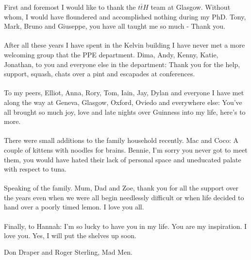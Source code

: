\begin{acknowledgements}
First and foremost I would like to thank the $t\bar{t}H$ team at Glasgow. Without whom, I would have floundered and accomplished nothing during my PhD. Tony, Mark, Bruno and Giuseppe, you have all taught me so much - Thank you.\\
\\
After all these years I have spent in the Kelvin building I have never met a more welcoming group that the PPE department. Dima, Andy, Kenny, Katie, Jonathan, to you and everyone else in the department: Thank you for the help, support, squash, chats over a pint and escapades at conferences.\\
\\
To my peers, Elliot, Anna, Rory, Tom, Iain, Jay, Dylan and everyone I have met along the way at Geneva, Glasgow, Oxford, Oviedo and everywhere else: You've all brought so much joy, love and late nights over Guinness into my life, here’s to more.\\
\\
There were small additions to the family household recently. Mac and Coco: A couple of kittens with noodles for brains. Bennie, I'm sorry you never got to meet them, you would have hated their lack of personal space and uneducated palate with respect to tuna.\\
\\
Speaking of the family. Mum, Dad and Zoe, thank you for all the support over the years even when we were all begin needlessly difficult or when life decided to hand over a poorly timed lemon. I love you all.\\
\\
Finally, to Hannah: I'm so lucky to have you in my life. You are my inspiration. I love you. Yes, I will put the shelves up soon.
\end{acknowledgements}




\tableofcontents


%
  {Don Draper and Roger Sterling, Mad Men.}
\thispagestyle{empty}

